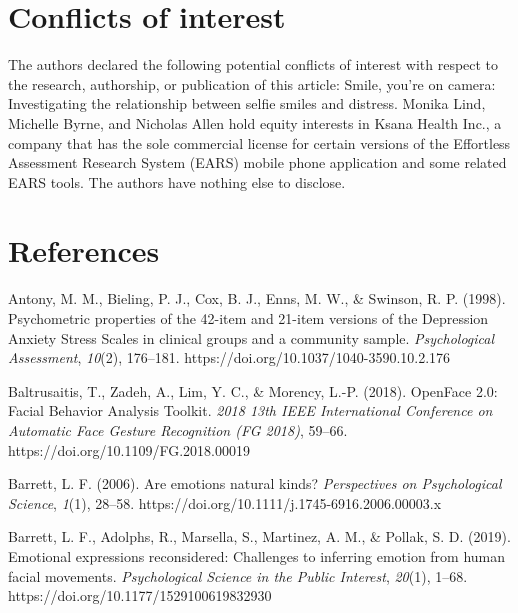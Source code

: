 \documentclass[authordate, empirical,issue]{jote-new-article}
\begin{document}
\section{Conflicts of interest}







The authors declared the following potential conflicts of interest with respect to the research, authorship, or publication of this article: Smile, you're on camera: Investigating the relationship between selfie smiles and distress. Monika Lind, Michelle Byrne, and Nicholas Allen hold equity interests in Ksana Health Inc., a company that has the sole commercial license for certain versions of the Effortless Assessment Research System (EARS) mobile phone application and some related EARS tools. The authors have nothing else to disclose.







\section{References}



\hspace*{\parindent}Antony, M. M., Bieling, P. J., Cox, B. J., Enns, M. W., \& Swinson, R. P. (1998). Psychometric properties of the 42-item and 21-item versions of the Depression Anxiety Stress Scales in clinical groups and a community sample. \emph{Psychological Assessment}, \emph{10}(2), 176--181. https://doi.org/10.1037/1040-3590.10.2.176



Baltrusaitis, T., Zadeh, A., Lim, Y. C., \& Morency, L.-P. (2018). OpenFace 2.0: Facial Behavior Analysis Toolkit. \emph{2018 13th IEEE International Conference on Automatic Face Gesture Recognition (FG 2018)}, 59--66. https://doi.org/10.1109/FG.2018.00019



Barrett, L. F. (2006). Are emotions natural kinds? \emph{Perspectives on Psychological Science}, \emph{1}(1), 28--58. https://doi.org/10.1111/j.1745-6916.2006.00003.x



Barrett, L. F., Adolphs, R., Marsella, S., Martinez, A. M., \& Pollak, S. D. (2019). Emotional expressions reconsidered: Challenges to inferring emotion from human facial movements. \emph{Psychological Science in the Public Interest}, \emph{20}(1), 1--68. https://doi.org/10.1177/1529100619832930
\end{document}
